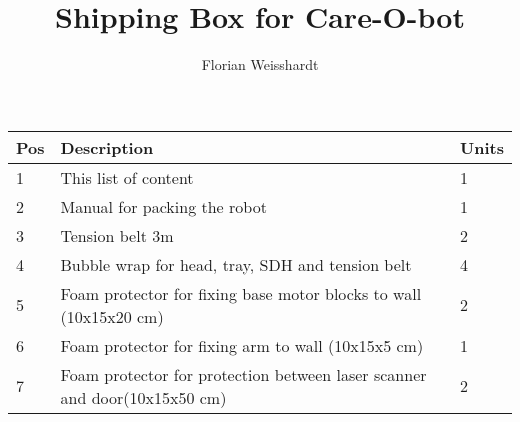 \documentclass{article}
\title{Shipping Box for Care-O-bot} %
\author{Florian Weisshardt} %
\begin{document}
\maketitle %

\begin{tabular}{|l|l|l|}
\hline
\textbf{Pos} & \textbf{Description} & \textbf{Units}\\
\hline\hline
1 & This list of content & 1\\
2 & Manual for packing the robot & 1\\
3 & Tension belt 3m & 2\\
4 & Bubble wrap for head, tray, SDH and tension belt & 4\\
5 & Foam protector for fixing base motor blocks to wall (10x15x20 cm) & 2\\
6 & Foam protector for fixing arm to wall (10x15x5 cm) & 1\\
7 & Foam protector for protection between laser scanner and door(10x15x50 cm) & 2\\
\hline
\end{tabular}
\end{document}
